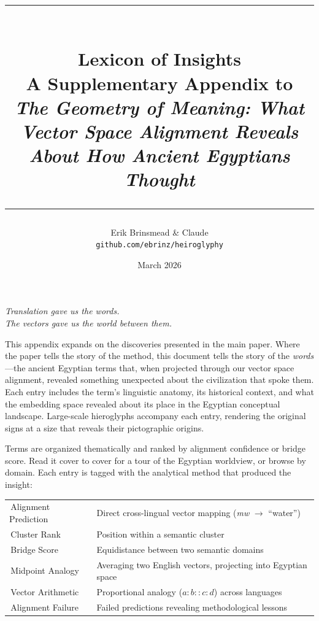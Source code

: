 \documentclass[11pt, a4paper]{article}
\title{
    \vspace{-1cm}
    {\color{gold}\rule{\textwidth}{2pt}}\\[12pt]
    {\Huge\bfseries\color{lapis} Lexicon of Insights}\\[6pt]
    {\Large\color{terracotta} A Supplementary Appendix to}\\[2pt]
    {\large\color{lapis}\textit{The Geometry of Meaning: What Vector Space Alignment Reveals\\
    About How Ancient Egyptians Thought}}\\[8pt]
    {\color{gold}\rule{\textwidth}{2pt}}
}
\author{
    Erik Brinsmead \quad \& \quad Claude\\[4pt]
    \texttt{\small github.com/ebrinz/heiroglyphy}
}
\date{March 2026}
\begin{document}
\maketitle
\thispagestyle{fancy}

\begin{center}
\textit{Translation gave us the words.\\The vectors gave us the world between them.}
\end{center}

\vspace{-6pt}

\noindent
This appendix expands on the discoveries presented in the main paper. Where the paper tells the story of the method, this document tells the story of the \emph{words}---the ancient Egyptian terms that, when projected through our vector space alignment, revealed something unexpected about the civilization that spoke them. Each entry includes the term's linguistic anatomy, its historical context, and what the embedding space revealed about its place in the Egyptian conceptual landscape. Large-scale hieroglyphs accompany each entry, rendering the original signs at a size that reveals their pictographic origins.

\noindent
Terms are organized thematically and ranked by alignment confidence or bridge score. Read it cover to cover for a tour of the Egyptian worldview, or browse by domain. Each entry is tagged with the analytical method that produced the insight:

\smallskip
\begin{center}
\begin{tabular}{ll}
\colorbox{tagbg}{\small\sffamily\color{nightsky}\,Alignment Prediction\,} & Direct cross-lingual vector mapping (\textit{mw} $\rightarrow$ ``water'') \\[3pt]
\colorbox{tagbg}{\small\sffamily\color{nightsky}\,Cluster Rank\,} & Position within a semantic cluster \\[3pt]
\colorbox{tagbg}{\small\sffamily\color{nightsky}\,Bridge Score\,} & Equidistance between two semantic domains \\[3pt]
\colorbox{tagbg}{\small\sffamily\color{nightsky}\,Midpoint Analogy\,} & Averaging two English vectors, projecting into Egyptian space \\[3pt]
\colorbox{tagbg}{\small\sffamily\color{nightsky}\,Vector Arithmetic\,} & Proportional analogy ($a:b :: c:d$) across languages \\[3pt]
\colorbox{tagbg}{\small\sffamily\color{nightsky}\,Alignment Failure\,} & Failed predictions revealing methodological lessons \\
\end{tabular}
\end{center}
\smallskip
\end{document}
